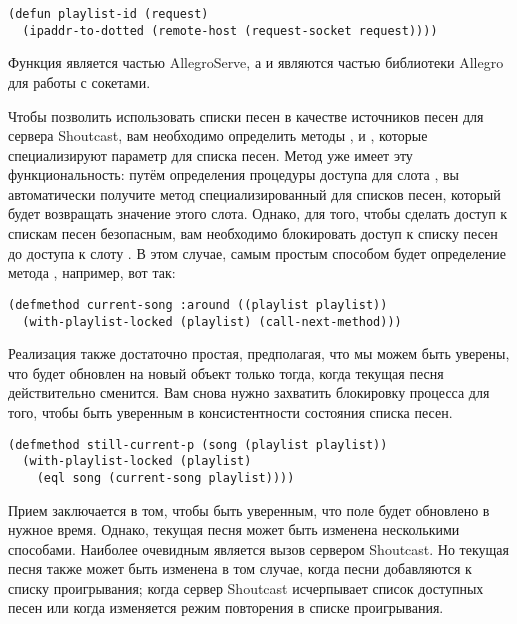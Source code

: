 \begin{lstlisting}
(defun playlist-id (request)
  (ipaddr-to-dotted (remote-host (request-socket request))))
\end{lstlisting}

Функция  является частью AllegroServe, а  и
 являются частью библиотеки Allegro для работы с сокетами.

Чтобы позволить использовать списки песен в качестве источников песен для сервера
Shoutcast, вам необходимо определить методы ,  и
, которые специализируют параметр  для списка
песен. Метод  уже имеет эту функциональность: путём определения
процедуры доступа  для слота , вы автоматически
получите метод  специализированный для списков песен, который будет
возвращать значение этого слота. Однако, для того, чтобы сделать доступ к спискам песен
безопасным, вам необходимо блокировать доступ к списку песен до доступа к слоту
.  В этом случае, самым простым способом будет определение метода
, например, вот так:

\begin{lstlisting}
(defmethod current-song :around ((playlist playlist))
  (with-playlist-locked (playlist) (call-next-method)))
\end{lstlisting}

Реализация  также достаточно простая, предполагая, что мы можем быть
уверены, что  будет обновлен на новый объект  только тогда,
когда текущая песня действительно сменится.  Вам снова нужно захватить блокировку процесса
для того, чтобы быть уверенным в консистентности состояния списка песен.

\begin{lstlisting}
(defmethod still-current-p (song (playlist playlist))
  (with-playlist-locked (playlist)
    (eql song (current-song playlist))))
\end{lstlisting}

Прием заключается в том, чтобы быть уверенным, что поле  будет
обновлено в нужное время.  Однако, текущая песня может быть изменена несколькими
способами.  Наиболее очевидным является вызов  сервером
Shoutcast.  Но текущая песня также может быть изменена в том случае, когда песни
добавляются к списку проигрывания; когда сервер Shoutcast исчерпывает список доступных
песен или когда изменяется режим повторения в списке проигрывания.

